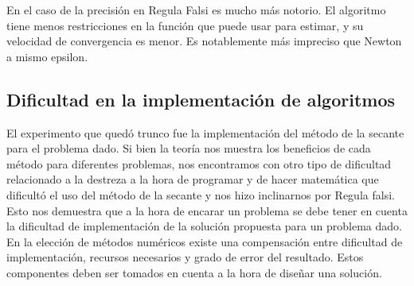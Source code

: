 En el caso de la precisi\'on en Regula Falsi es mucho m\'as notorio. El algoritmo tiene menos restricciones en 
la funci\'on que puede usar para estimar, y su velocidad de convergencia es menor. Es notablemente m\'as impreciso
que Newton a mismo epsilon.

\subsection{Dificultad en la implementaci\'on de algoritmos}

El experimento que qued\'o trunco fue la implementaci\'on del m\'etodo de la secante para el problema dado. 
Si bien la teor\'ia nos muestra los beneficios de cada m\'etodo para diferentes problemas, nos encontramos con otro 
tipo de dificultad relacionado a la destreza a la hora de programar y de hacer matem\'atica que dificult\'o el uso 
del m\'etodo de la secante y nos hizo inclinarnos por Regula falsi. Esto nos demuestra que a la hora de encarar un 
problema se debe tener en cuenta la dificultad de implementaci\'on de la soluci\'on propuesta para un problema dado. 
En la elecci\'on de m\'etodos num\'ericos existe una compensaci\'on entre dificultad de implementaci\'on, recursos necesarios 
y grado de error del resultado. Estos componentes deben ser tomados en cuenta a la hora de dise\~nar una soluci\'on.
